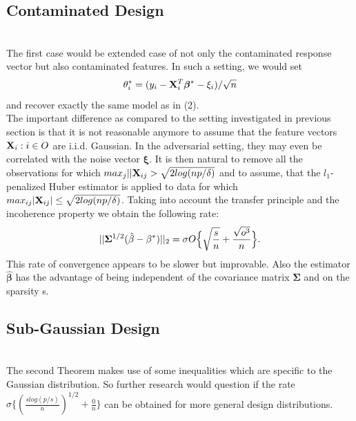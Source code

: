 \documentclass[a4paper,10pt]{article}
\theoremstyle{definition}
\begin{document}
\subsection{Contaminated Design}\ \\
The first case would be extended case of not only the contaminated response vector but also contaminated features. In such a setting, we would set
\begin{equation*}
	\theta_i^* = (y_i - \bold{X}^T_i\boldsymbol{\beta}^* - \xi_i)/\sqrt{n}
\end{equation*}
and recover exactly the same model as in (2).\\
The important difference as compared to the setting investigated in previous section is that it is not reasonable anymore to assume that the feature vectors {$\bold{X}_i:i\in O$} are i.i.d. Gaussian. In the adversarial setting, they may even be correlated with the noise vector $\boldsymbol{\xi}$. It is then natural to remove all the observations for which $max_j||\bold{X}_{ij} > \sqrt{2log(np/\delta)}$ and to assume, that the $l_1$-penalized Huber estimator is applied to data for which $max_{ij}|\bold{X}_{ij}| \leq \sqrt{2log(np/\delta)}$.
Taking into account the transfer principle and the incoherence property we obtain the following rate:
\begin{equation}
	||\bold{\Sigma}^{1/2}(\hat{\beta}-\beta^*)||_2 =\sigma O \Big\{ \sqrt{\frac{s}{n}} + \frac{\sqrt{o^3}}{n} \Big\}.
\end{equation}
This rate of convergence appears to be slower but improvable. Also the estimator $\boldsymbol{\hat{\beta}}$ has the advantage of being independent of the covariance matrix $\boldsymbol{\Sigma}$ and on the sparsity s.

\subsection{Sub-Gaussian Design}\ \\
The second Theorem makes use of some inequalities which are specific to the Gaussian distribution. So further research would question if the rate $\sigma \Big\{ (\frac{slog(p/s)}{n})^{1/2} + \frac{0}{n} \Big\}$ can be obtained for more general design distributions.
\end{document}
